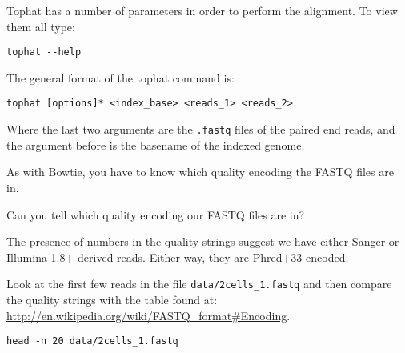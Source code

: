 \begin{steps}
Tophat has a number of parameters in order to perform the alignment. To view them all type:
\begin{lstlisting}
tophat --help
\end{lstlisting}
\end{steps}

\begin{information}
The general format of the tophat command is:
\begin{lstlisting}
tophat [options]* <index_base> <reads_1> <reads_2>
\end{lstlisting}

Where the last two arguments are the \texttt{.fastq} files of the paired end reads, and the argument
before is the basename of the indexed genome.
\end{information}

\begin{note}
As with Bowtie, you have to know which quality encoding the FASTQ
files are in.
\end{note}

\begin{questions}
Can you tell which quality encoding our FASTQ files are in?
\begin{answer}
The presence of numbers in the quality strings suggest we have either Sanger or
Illumina 1.8+ derived reads. Either way, they are Phred+33 encoded.
\end{answer}

\begin{information}
Look at the first few reads in the file \texttt{data/2cells\_1.fastq} and
then compare the quality strings with the table found at:
\url{http://en.wikipedia.org/wiki/FASTQ_format#Encoding}. 
\begin{lstlisting}
head -n 20 data/2cells_1.fastq
\end{lstlisting}
\end{information}
\end{questions}

